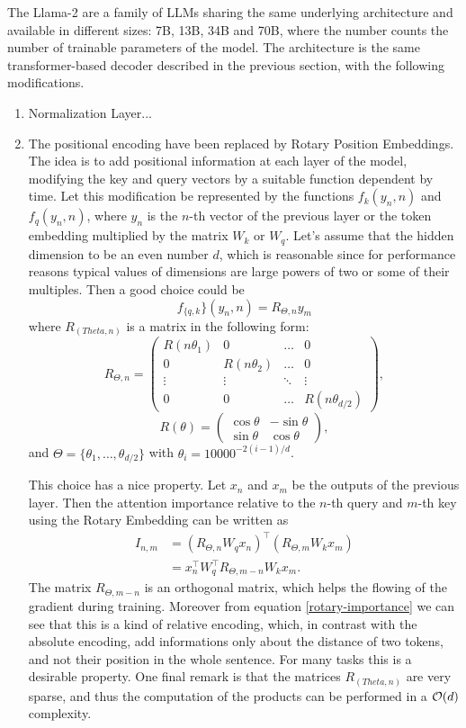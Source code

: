 \documentclass[]{marticle}
\begin{document}
The Llama-2 are a family of LLMs sharing the same underlying architecture and available in different
sizes: 7B, 13B, 34B and 70B, where the number counts the number of trainable parameters of the
model. The architecture is the same transformer-based decoder described in the previous section,
with the following modifications.
\begin{enumerate}
\item Normalization Layer... 

\item The positional encoding have been replaced by Rotary Position Embeddings. The idea is to add
positional information at each layer of the model, modifying the key and query vectors by a
suitable function dependent by time. Let this modification be represented by the functions 
$f_k(y_n, n)$ and $f_q(y_n, n)$, where $y_n$ is the $n$-th vector of the previous layer or the
token embedding  multiplied by the matrix $W_k$ or $W_q$. Let's assume that the hidden dimension
to be an even number $d$, which is reasonable since for performance reasons typical values of
dimensions are large powers of two or some of their multiples. Then a good choice could be
$$ f_{\{q, k}\}(y_n, n) = R_{\Theta, n} y_m $$
where $R_(Theta, n)$ is a matrix in the following form:
$$
    R_{\Theta, n} = \begin{pmatrix} 
      R(n \theta_1)& 0& \dots& 0 \\
      0& R(n \theta_2)& \dots& 0 \\
      \vdots& \vdots& \ddots& \vdots \\
      0&0& \dots& R(n \theta_{d / 2})
    \end{pmatrix},
$$
$$
    R(\theta) = \begin{pmatrix} 
        \cos\theta & -\sin\theta \\ \sin\theta & \cos\theta
    \end{pmatrix},
$$
and $\Theta = \{ \theta_1, \dots, \theta_{d / 2} \}$ with $\theta_i = 10000^{-2(i-1) / d}$.

This choice has a nice property. Let $x_n$ and $x_m$ be the outputs of the previous layer. Then
the attention importance relative to the $n$-th query and $m$-th key using the Rotary Embedding
can be written as
\begin{align}\label{rotary-importance}
I_{n,m} &= (R_{\Theta, n}W_q x_n)^\top (R_{\Theta, m}W_k x_m) \\ 
        &=  x_n^\top W_q^\top R_{\Theta, m-n} W_k x_m. \nonumber
\end{align}
The matrix $R_{\Theta, m-n}$ is an orthogonal matrix, which helps the flowing of the gradient
during training. Moreover from equation \ref{rotary-importance} we can see that this is a kind of
relative encoding, which, in contrast with the absolute encoding, add informations only about the
distance of two tokens, and not their position in the whole sentence. For many tasks this is a
desirable property. One final remark is that the matrices $R_(Theta, n)$ are very sparse, and thus
the computation of the products can be performed in a $\mathcal{O}(d)$ complexity.


\end{enumerate}
\end{document}
